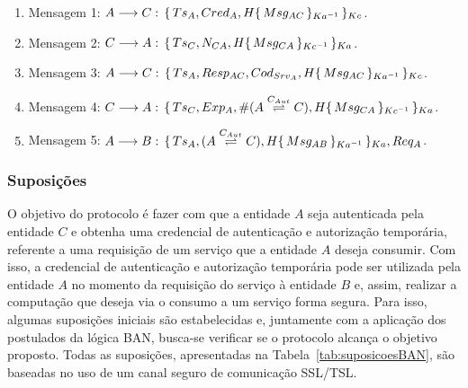 \begin{enumerate}
  \item Mensagem 1: ${A}\longrightarrow{C}:\,{\{\,{Ts_A,Cred_A,H{\{\,{Msg_{AC}}\,\}_{Ka ^{-1}}}}\,\}_{Kc}}$.
  \item Mensagem 2: ${C}\longrightarrow{A}:\,{\{\,{Ts_C,{N_{CA}},H{\{\,{Msg_{CA}}\,\}_{Kc ^{-1}}}}\,\}_{Ka}}$.
  \item Mensagem 3: ${A}\longrightarrow{C}:\,{\{\,{Ts_A,{Resp_{AC}},Cod_{Srv_A},H{\{\,{Msg_{AC}}\,\}_{Ka ^{-1}}}}\,\}_{Kc}}$.
  \item Mensagem 4: ${C}\longrightarrow{A}:\,{\{\,{Ts_C,Exp_A,\#({A}\stackrel{{C_{Aut}}}{\rightleftharpoons}{C}),H{\{\,{Msg_{CA}}\,\}_{Kc ^{-1}}}}\,\}_{Ka}}$.
  \item Mensagem 5: ${A}\longrightarrow{B}:\,{\{\,{Ts_A,({A}\stackrel{{C_{Aut}}}{\rightleftharpoons}{C}),H{\{\,{Msg_{AB}}\,\}_{Ka ^{-1}}}}\,\}_{Ka}},{Req_A}$.

\end{enumerate}

\subsubsection{Suposições}\label{sec:Suposicoes}

O objetivo do protocolo é fazer com que a entidade ${A}$ seja autenticada pela entidade ${C}$ e obtenha uma credencial de autenticação e autorização temporária, referente a uma requisição de um serviço que a entidade ${A}$ deseja consumir. Com isso, a credencial de autenticação e autorização temporária pode ser utilizada pela entidade ${A}$ no momento da requisição do serviço à entidade ${B}$ e, assim, realizar a computação que deseja via o consumo a um serviço forma segura. Para isso, algumas suposições iniciais são estabelecidas e, juntamente com a aplicação dos postulados da lógica BAN, busca-se verificar se o protocolo alcança o objetivo proposto. Todas as suposições, apresentadas na Tabela~\ref{tab:suposicoesBAN}, são baseadas no uso de um canal seguro de comunicação SSL/TSL. %

